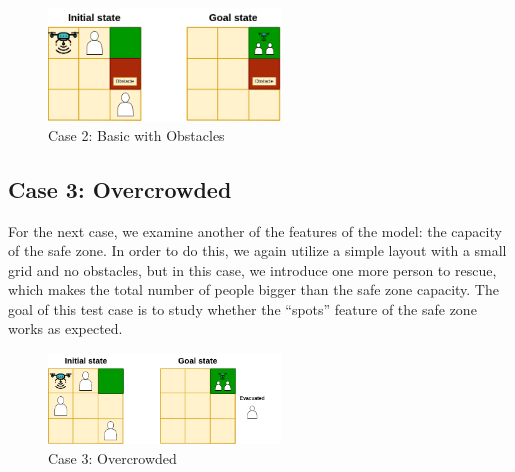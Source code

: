 \documentclass{article}
\begin{document}
\begin{figure}[ht]
    \centering
    \includegraphics[width=0.55\textwidth]{assets/problem-2-basic-obstacle.drawio.png}
    \caption{Case 2: Basic with Obstacles}
    \label{fig:initial-state-obstacles}
\end{figure}

\FloatBarrier

\subsection{Case 3: Overcrowded}

For the next case, we examine another of the features of the model: the capacity of the safe zone. In order to do this, we again utilize a simple layout with a small grid and no obstacles, but in this case, we introduce one more person to rescue, which makes the total number of people bigger than the safe zone capacity. The goal of this test case is to study whether the “spots” feature of the safe zone works as expected.

\begin{figure}[ht]
    \centering
    \includegraphics[width=0.55\textwidth]{assets/problem-3-overcrowded.drawio.png}
    \caption{Case 3: Overcrowded}
    \label{fig:initial-state-overcrowded}
\end{figure}

\FloatBarrier
\end{document}
